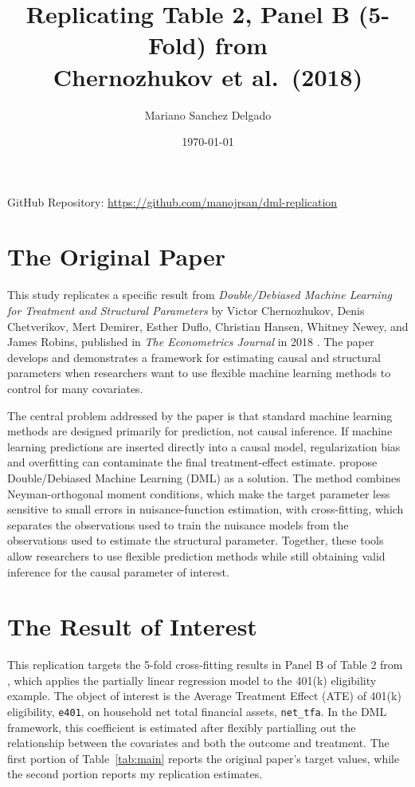 \documentclass[12pt]{article}
\title{Replicating Table 2, Panel B (5-Fold) from \\ Chernozhukov et al.\ (2018)}
\author{Mariano Sanchez Delgado}
\date{\today}
\begin{document}
	
	\maketitle
	\begin{center}
		\small GitHub Repository: \href{https://github.com/manojrsan/dml-replication}{https://github.com/manojrsan/dml-replication}
	\end{center}
	\section{The Original Paper}
	
	This study replicates a specific result from \textit{Double/Debiased Machine Learning for Treatment and Structural Parameters} by Victor Chernozhukov, Denis Chetverikov, Mert Demirer, Esther Duflo, Christian Hansen, Whitney Newey, and James Robins, published in \textit{The Econometrics Journal} in 2018 \cite{chernozhukov2018}. The paper develops and demonstrates a framework for estimating causal and structural parameters when researchers want to use flexible machine learning methods to control for many covariates.
	
	The central problem addressed by the paper is that standard machine learning methods are designed primarily for prediction, not causal inference. If machine learning predictions are inserted directly into a causal model, regularization bias and overfitting can contaminate the final treatment-effect estimate. \cite{chernozhukov2018} propose Double/Debiased Machine Learning (DML) as a solution. The method combines Neyman-orthogonal moment conditions, which make the target parameter less sensitive to small errors in nuisance-function estimation, with cross-fitting, which separates the observations used to train the nuisance models from the observations used to estimate the structural parameter. Together, these tools allow researchers to use flexible prediction methods while still obtaining valid inference for the causal parameter of interest.
	
	\section{The Result of Interest}
	
	This replication targets the 5-fold cross-fitting results in Panel B of Table 2 from \cite{chernozhukov2018}, which applies the partially linear regression model to the 401(k) eligibility example. The object of interest is the Average Treatment Effect (ATE) of 401(k) eligibility, \texttt{e401}, on household net total financial assets, \texttt{net\_tfa}. In the DML framework, this coefficient is estimated after flexibly partialling out the relationship between the covariates and both the outcome and treatment. The first portion of Table~\ref{tab:main} reports the original paper's target values, while the second portion reports my replication estimates.
	
\end{document}
